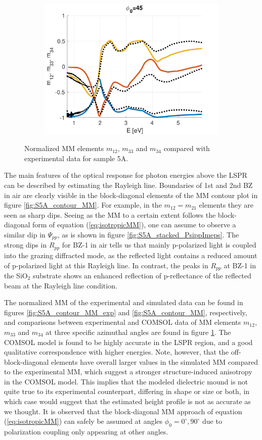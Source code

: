 \begin{figure}[h!]
   \begin{subfigure}{\linewidth}
        \centering
        \includegraphics[width=.49\linewidth, trim= 0cm 0cm 0cm 0cm, clip]{figures/ch4/S5A/S5A_NCS_phi45.pdf}
   \end{subfigure}
   \caption{Normalized MM elements $m_{12}$, $m_{33}$ and $m_{34}$ compared with experimental data for sample 5A.}
   \label{fig:S5A_NCS}
\end{figure}
The main features of the optical response for photon energies above the LSPR can be described by estimating the Rayleigh line. Boundaries of 1st and 2nd BZ in air are clearly visible in the block-diagonal elements of the MM contour plot in figure \ref{fig:S5A_contour_MM}. For example, in the $m_{12}=m_{21}$ elements they are seen as sharp dips. Seeing as the MM to a certain extent follows the block-diagonal form of equation (\ref{eq:isotropicMM}), one can assume to observe a similar dip in $\Psi_{pp}$, as is shown in figure \ref{fig:S5A_stacked_PsippImeps}. The strong dips in $R_{pp}$ for BZ-1 in air tells us that mainly p-polarized light is coupled into the grazing diffracted mode, as the reflected light contains a reduced amount of p-polarized light at this Rayleigh line. In contrast, the peaks in $R_{pp}$ at BZ-1 in the SiO$_2$ substrate shows an enhanced reflection of p-reflectance of the reflected beam at the Rayleigh line condition.

The normalized MM of the experimental and simulated data can be found in figures \ref{fig:S5A_contour_MM_exp} and \ref{fig:S5A_contour_MM}, respectively, and comparisons between experimental and COMSOL data of MM elements $m_{12}$, $m_{33}$ and $m_{34}$ at three specific azimuthal angles are found in figure \ref{fig:S5A_NCS}. The COMSOL model is found to be highly accurate in the LSPR region, and a good qualitative correspondence with higher energies. Note, however, that the off-block-diagonal elements have overall larger values in the simulated MM compared to the experimental MM, which suggest a stronger structure-induced anisotropy in the COMSOL model. This implies that the modeled dielectric mound is not quite true to its experimental counterpart, differing in shape or size or both, in which case would suggest that the estimated height profile is not as accurate as we thought. It is observed that the block-diagonal MM approach of equation (\ref{eq:isotropicMM}) can safely be assumed at angles $\phi_0=0^\circ, 90^\circ$ due to polarization coupling only appearing at other angles. 


